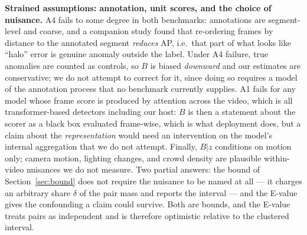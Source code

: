 \documentclass[number,preprint,12pt]{elsarticle}
\begin{document}
\textbf{Strained assumptions: annotation, unit scores, and the choice of nuisance.}
A4 fails to some degree in both benchmarks: annotations are segment-level and
coarse, and a companion study found that re-ordering frames by distance to the
annotated segment \emph{reduces} AP, i.e.~that part of what looks like ``halo'' error
is genuine anomaly outside the label. Under A4 failure, true anomalies are
counted as controls, so \(B\) is biased \emph{downward} and our estimates are
conservative; we do not attempt to correct for it, since doing so requires a
model of the annotation process that no benchmark currently supplies. A1 fails
for any model whose frame score is produced by attention across the video,
which is all transformer-based detectors including our host: \(B\) is then a
statement about the scorer as a black box evaluated frame-wise, which is what
deployment does, but a claim about the \emph{representation} would need an
intervention on the model's internal aggregation that we do not attempt.
Finally, \(B|z\) conditions on motion only; camera motion, lighting changes, and
crowd density are plausible within-video nuisances we do not measure. Two
partial answers: the bound of Section~\ref{sec:bound} does not require the
nuisance to be named at all --- it charges an arbitrary share \(\delta\) of the
pair mass and reports the interval --- and the E-value gives the confounding a
claim could survive. Both are bounds, and the E-value treats pairs as
independent and is therefore optimistic relative to the clustered interval.
\end{document}
